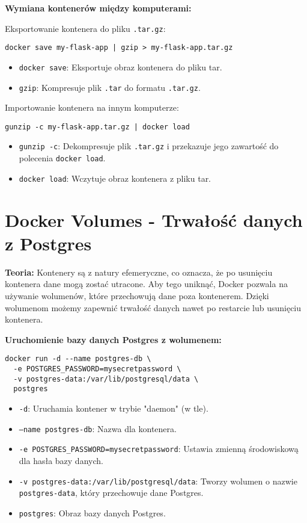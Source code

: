 \documentclass{article}
\begin{document}
\textbf{Wymiana kontenerów między komputerami:}

Eksportowanie kontenera do pliku \texttt{.tar.gz}:

\noindent\begin{lstlisting}
docker save my-flask-app | gzip > my-flask-app.tar.gz
\end{lstlisting}

\begin{itemize}
    \item \texttt{docker save}: Eksportuje obraz kontenera do pliku tar.
    \item \texttt{gzip}: Kompresuje plik \texttt{.tar} do formatu \texttt{.tar.gz}.
\end{itemize}

Importowanie kontenera na innym komputerze:

\noindent\begin{lstlisting}
gunzip -c my-flask-app.tar.gz | docker load
\end{lstlisting}

\begin{itemize}
    \item \texttt{gunzip -c}: Dekompresuje plik \texttt{.tar.gz} i przekazuje jego zawartość do polecenia \texttt{docker load}.
    \item \texttt{docker load}: Wczytuje obraz kontenera z pliku tar.
\end{itemize}

\section{Docker Volumes - Trwałość danych z Postgres}

\textbf{Teoria:}  
Kontenery są z natury efemeryczne, co oznacza, że po usunięciu kontenera dane mogą zostać utracone. Aby tego uniknąć, Docker pozwala na używanie wolumenów, które przechowują dane poza kontenerem. Dzięki wolumenom możemy zapewnić trwałość danych nawet po restarcie lub usunięciu kontenera.

\textbf{Uruchomienie bazy danych Postgres z wolumenem:}

\noindent\begin{lstlisting}
docker run -d --name postgres-db \
  -e POSTGRES_PASSWORD=mysecretpassword \
  -v postgres-data:/var/lib/postgresql/data \
  postgres
\end{lstlisting}

\begin{itemize}
    \item \texttt{-d}: Uruchamia kontener w trybie "daemon" (w tle).
    \item \texttt{--name postgres-db}: Nazwa dla kontenera.
    \item \texttt{-e POSTGRES\_PASSWORD=mysecretpassword}: Ustawia zmienną środowiskową dla hasła bazy danych.
    \item \texttt{-v postgres-data:/var/lib/postgresql/data}: Tworzy wolumen o nazwie \texttt{postgres-data}, który przechowuje dane Postgres.
    \item \texttt{postgres}: Obraz bazy danych Postgres.
\end{itemize}
\end{document}
